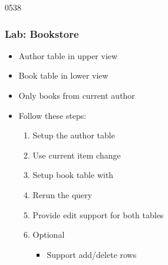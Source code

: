 \begin{slide}{0538}\frametitle{Lab: Bookstore}
\begin{itemize}
\item Author table in upper view
\item Book table in lower view
\item Only books from current author
\item Follow these steps:
  \begin{enumerate}
  \item Setup the author table
  \item Use current item change
  \item Setup book table with 
  \item Rerun the query
  \item Provide edit support for both tables
  \item Optional
    \begin{itemize}
    \item Support add/delete rows
    \end{itemize}
 \end{enumerate}
\end{itemize}
\end{slide}
